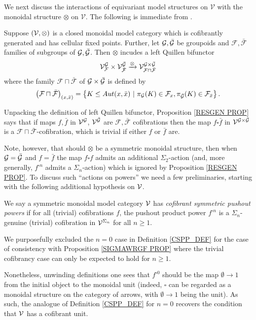 \documentclass[a4paper,10pt
,draft
]{article}%
\renewcommand{\F}{\mathcal F}
\renewcommand{\1}{\eta}%
\begin{document}
We next discuss the interactions of equivariant model structures on 
$\mathcal{V}$ with the monoidal structure $\otimes$ on $\mathcal{V}$.
The following is immediate from
\cite[Rem. 6.14]{BP_geo}.


\begin{proposition}\label{RESGEN PROP}
Suppose $(\mathcal V, \otimes)$ is a closed monoidal model category which is cofibrantly generated and has cellular fixed points.
Further, let $\mathcal{G}, \bar{\mathcal{G}}$ be groupoids and $\F,\bar{\F}$
families of subgroups of $\mathcal{G}, \bar{\mathcal{G}}$.
Then $\otimes$ incudes a left Quillen bifunctor
\[
	\V^{\G}_{\F} \times \V^{\bar \G}_{\bar{\F}} \xrightarrow{\otimes} \V^{\G \times \bar \G}_{\F \sqcap \bar{\F}}
\]
where the family $\F \sqcap \bar{\F}$ of $\mathcal{G} \times \bar{\mathcal{G}}$ is defined by
\[
\left(\F \sqcap \bar{\F}\right)_{(x,\bar{x})}
=
\left\{K\leq Aut(x,\bar{x})\ |\ \pi_{\G} (K) \in \F_x,
\pi_{\bar{\G}} (K) \in \F_{\bar{x}}
\right\}.
\]
\end{proposition}

Unpacking the definition of left Quillen bifunctor,
Proposition \ref{RESGEN PROP}
says that if maps
$f, \bar{f}$
in 
$\mathcal V^{\mathcal{G}}$,
$\mathcal V^{\bar{\mathcal{G}}}$
are 
$\F,\bar{\F}$
cofibrations
then the map
$f\square \bar{f}$
in $\mathcal{V}^{\mathcal{G} \times \bar{\mathcal{G}}}$
is a 
$\F \sqcap \bar{\F}$-cofibration,
which is trivial if either $f$ or $\bar{f}$ are.

Note, however, that should $\otimes$ be a symmetric monoidal structure, then when $\mathcal{G} = \bar {\mathcal{G}}$ and $f = \bar f$
the map $f \square f$
admits an additional $\Sigma_2$-action
(and, more generally, $f^{\square n}$ admits a $\Sigma_n$-action)
which is ignored by Proposition \ref{RESGEN PROP}.
To discuss such ``actions on powers'' we need a few preliminaries, 
starting with the following additional hypothesis on $\mathcal V$.


\begin{definition}\label{CSPP_DEF}
      We say a symmetric monoidal model category $\mathcal V$ has \textit{cofibrant symmetric pushout powers} if
      for all (trivial) cofibrations $f$, the pushout product power $f^{\square n}$
      is a $\Sigma_n$-genuine (trivial) cofibration in $\mathcal V^{\Sigma_n}$ for all $n \geq 1$. 
\end{definition}

\begin{remark}
We purposefully excluded the $n=0$ case in Definition \ref{CSPP_DEF}
for the case of consistency with Proposition \ref{SIGMAWRGF PROP}
where the trivial cofibrancy case can only be expected to hold for $n\geq 1$.

Nonetheless, unwinding definitions one sees that
$f^{\square 0}$
should be the map 
$\emptyset \to 1$
from the initial object to the monoidal unit
(indeed, $\square$ can be regarded as a monoidal structure on the category of arrows, with $\emptyset \to 1$ being the unit).
As such, the analogue of Definition \ref{CSPP_DEF} for $n=0$ 
recovers the condition that $\mathcal V$ has a cofibrant unit.
\end{remark}
\end{document}
